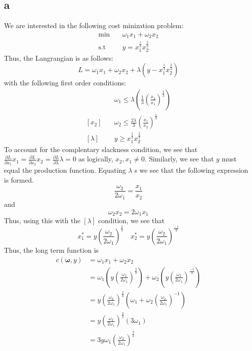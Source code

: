 \documentclass[11pt]{article}
\newcommand{\st}{\text{s.t}}
\begin{document}
\subsection*{a}
We are interested in the following cost minization problem:
\begin{align*}
    \min & \quad \omega_1 x_1 + \omega_2 x_2\\
    \st & \quad y = x_1^{\frac{1}{3}} x_2^{\frac{2}{3}}
\end{align*}
Thus, the Langrangian is as follows:
\[
L = \omega_1x_1 + \omega_2x_2 +\lambda(y -  x_1^{\frac{1}{3}} x_2^{\frac{2}{3}})
\]
with the following first order conditions:
\begin{align*}
    [x_1] & \quad \omega_1 \leq \lambda \left( \frac{1}{3} \left( \frac{x_2}{x_1} \right)^\frac{2}{3} \right)\\
    [x_2] & \quad \omega_2 \leq \frac{2\lambda}{3} \left( \frac{x_1}{x_2} \right)^\frac{1}{3}\\
    [\lambda] & \quad y \geq x_1^\frac{1}{3} x_2^\frac{2}{3}
\end{align*}
To account for the complentary slackness condition, we see that $\frac{\partial L}{\partial x_1}x_1 = \frac{\partial L}{\partial x_2}x_2 = \frac{\partial L}{\partial \lambda}\lambda = 0$
as logically, $x_2, x_1 \neq 0$. Similarly, we see that $y$ must equal the production function. Equating $\lambda$ s we see that the following expression is formed. 
\[
\frac{\omega_2}{2 \omega_1} = \frac{x_1}{x_2}
\]
and 
\[
\omega_2 x_2 = 2\omega_1 x_1
\]
Thus, using this with the $[\lambda]$ condition, we see that
\[
x_1^* = y \left( \frac{\omega_2}{2\omega_1} \right)^\frac{2}{3} \quad x_2^* = y \left( \frac{\omega_2}{2\omega_1} \right)^\frac{-1}{3}
\]
Thus, the long term function is 
\begin{align*}
    c(\mathbf{\omega}, y) &= \omega_1 x_1 + \omega_2 x_2\\
    &= \omega_1 \left( y \left( \frac{\omega_2}{2\omega_1} \right)^\frac{2}{3} \right) + \omega_2 \left( y \left( \frac{\omega_2}{2\omega_1} \right)^\frac{-1}{3} \right) \\
    &= y \left( \frac{\omega_2}{2\omega_1} \right)^\frac{2}{3} \left( 
        \omega_1 + \omega_2 \left( \frac{\omega_2}{2\omega_1} \right)^{-1}
     \right)\\
     &= y \left( \frac{\omega_2}{2\omega_1} \right)^\frac{2}{3} (3\omega_1)\\
     &= 3y \omega_1\left( \frac{\omega_2}{2\omega_1} \right)^\frac{2}{3} 
 \end{align*}
\end{document}
